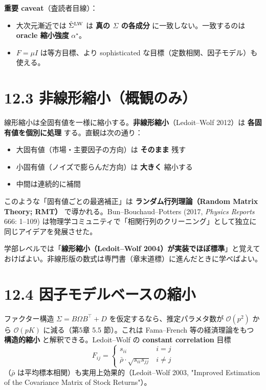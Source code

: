 \documentclass[11pt,a4paper]{report}
\begin{document}
\textbf{重要 caveat}（査読者目線）：
\begin{itemize}
\item 大次元漸近では $\hat\Sigma^{\rm LW}$ は \textbf{真の $\Sigma$ の各成分} に一致しない。一致するのは \textbf{oracle 縮小強度} $\alpha^\star$。
\item $F = \mu I$ は等方目標、より sophisticated な目標（定数相関、因子モデル）も使える。
\end{itemize}

\section{12.3 非線形縮小（概観のみ）}

線形縮小は全固有値を一様に縮小する。\textbf{非線形縮小}（Ledoit–Wolf 2012）は \textbf{各固有値を個別に処理} する。直観は次の通り：

\begin{itemize}
\item 大固有値（市場・主要因子の方向）は \textbf{そのまま} 残す
\item 小固有値（ノイズで膨らんだ方向）は \textbf{大きく} 縮小する
\item 中間は連続的に補間
\end{itemize}

このような「固有値ごとの最適補正」は \textbf{ランダム行列理論（Random Matrix Theory; RMT）} で導かれる。Bun–Bouchaud–Potters (2017, \emph{Physics Reports} 666: 1–109) は物理学コミュニティで「相関行列のクリーニング」として独立に同じアイデアを発展させた。

学部レベルでは「\textbf{線形縮小（Ledoit–Wolf 2004）が実装でほぼ標準}」と覚えておけばよい。非線形版の数式は専門書（章末道標）に進んだときに学べばよい。

\section{12.4 因子モデルベースの縮小}

ファクター構造 $\Sigma = B \Omega B^\top + D$ を仮定するなら、推定パラメタ数が $\mathcal{O}(p^2)$ から $\mathcal{O}(pK)$ に減る（第5章 5.5 節）。これは Fama–French 等の経済理論をもつ \textbf{構造的縮小} と解釈できる。Ledoit–Wolf の \textbf{constant correlation} 目標 \[ F_{ij} = \begin{cases} s_{ii} & i = j \\ \bar\rho \cdot \sqrt{s_{ii} s_{jj}} & i \neq j \end{cases} \] （$\bar\rho$ は平均標本相関）も実用上効果的（Ledoit–Wolf 2003, "Improved Estimation of the Covariance Matrix of Stock Returns"）。
\end{document}

